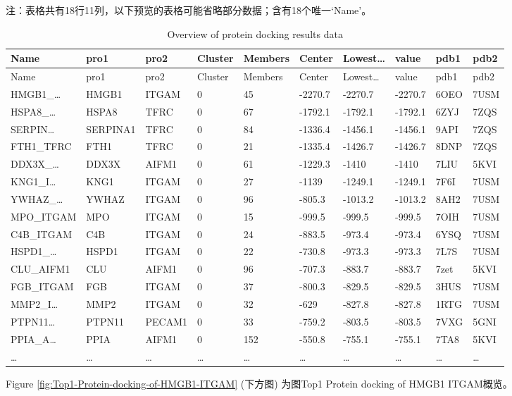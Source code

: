 \documentclass[
]{article}
\begin{document}
\begin{center}\begin{tcolorbox}[colback=gray!10, colframe=gray!50, width=0.9\linewidth, arc=1mm, boxrule=0.5pt]注：表格共有18行11列，以下预览的表格可能省略部分数据；含有18个唯一`Name'。
\end{tcolorbox}
\end{center}

\begin{longtable}[]{@{}llllllllll@{}}
\caption{\label{tab:Overview-of-protein-docking-results-data}Overview of protein docking results data}\tabularnewline
\toprule
Name & pro1 & pro2 & Cluster & Members & Center & Lowest\ldots{} & value & pdb1 & pdb2\tabularnewline
\midrule
\endfirsthead
\toprule
Name & pro1 & pro2 & Cluster & Members & Center & Lowest\ldots{} & value & pdb1 & pdb2\tabularnewline
\midrule
\endhead
HMGB1\_\ldots{} & HMGB1 & ITGAM & 0 & 45 & -2270.7 & -2270.7 & -2270.7 & 6OEO & 7USM\tabularnewline
HSPA8\_\ldots{} & HSPA8 & TFRC & 0 & 67 & -1792.1 & -1792.1 & -1792.1 & 6ZYJ & 7ZQS\tabularnewline
SERPIN\ldots{} & SERPINA1 & TFRC & 0 & 84 & -1336.4 & -1456.1 & -1456.1 & 9API & 7ZQS\tabularnewline
FTH1\_TFRC & FTH1 & TFRC & 0 & 21 & -1335.4 & -1426.7 & -1426.7 & 8DNP & 7ZQS\tabularnewline
DDX3X\_\ldots{} & DDX3X & AIFM1 & 0 & 61 & -1229.3 & -1410 & -1410 & 7LIU & 5KVI\tabularnewline
KNG1\_I\ldots{} & KNG1 & ITGAM & 0 & 27 & -1139 & -1249.1 & -1249.1 & 7F6I & 7USM\tabularnewline
YWHAZ\_\ldots{} & YWHAZ & ITGAM & 0 & 96 & -805.3 & -1013.2 & -1013.2 & 8AH2 & 7USM\tabularnewline
MPO\_ITGAM & MPO & ITGAM & 0 & 15 & -999.5 & -999.5 & -999.5 & 7OIH & 7USM\tabularnewline
C4B\_ITGAM & C4B & ITGAM & 0 & 24 & -883.5 & -973.4 & -973.4 & 6YSQ & 7USM\tabularnewline
HSPD1\_\ldots{} & HSPD1 & ITGAM & 0 & 22 & -730.8 & -973.3 & -973.3 & 7L7S & 7USM\tabularnewline
CLU\_AIFM1 & CLU & AIFM1 & 0 & 96 & -707.3 & -883.7 & -883.7 & 7zet & 5KVI\tabularnewline
FGB\_ITGAM & FGB & ITGAM & 0 & 37 & -800.3 & -829.5 & -829.5 & 3HUS & 7USM\tabularnewline
MMP2\_I\ldots{} & MMP2 & ITGAM & 0 & 32 & -629 & -827.8 & -827.8 & 1RTG & 7USM\tabularnewline
PTPN11\ldots{} & PTPN11 & PECAM1 & 0 & 33 & -759.2 & -803.5 & -803.5 & 7VXG & 5GNI\tabularnewline
PPIA\_A\ldots{} & PPIA & AIFM1 & 0 & 152 & -550.8 & -755.1 & -755.1 & 7TA8 & 5KVI\tabularnewline
\ldots{} & \ldots{} & \ldots{} & \ldots{} & \ldots{} & \ldots{} & \ldots{} & \ldots{} & \ldots{} & \ldots{}\tabularnewline
\bottomrule
\end{longtable}

Figure \ref{fig:Top1-Protein-docking-of-HMGB1-ITGAM} (下方图) 为图Top1 Protein docking of HMGB1 ITGAM概览。
\end{document}
